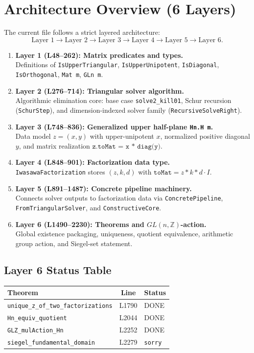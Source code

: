 \documentclass[11pt]{article}
\begin{document}
\section{Architecture Overview (6 Layers)}
The current file follows a strict layered architecture:
\[
\text{Layer 1} \rightarrow \text{Layer 2} \rightarrow \text{Layer 3} \rightarrow
\text{Layer 4} \rightarrow \text{Layer 5} \rightarrow \text{Layer 6}.
\]

\begin{enumerate}[leftmargin=1.5em]
\item \textbf{Layer 1 (L48--262): Matrix predicates and types.}\\
Definitions of \texttt{IsUpperTriangular}, \texttt{IsUpperUnipotent},
\texttt{IsDiagonal}, \texttt{IsOrthogonal}, \texttt{Mat m}, \texttt{GLn m}.
\item \textbf{Layer 2 (L276--714): Triangular solver algorithm.}\\
Algorithmic elimination core:
base case \texttt{solve2\_kill01}, Schur recursion (\texttt{SchurStep}),
and dimension-indexed solver family (\texttt{RecursiveSolveRight}).
\item \textbf{Layer 3 (L748--836): Generalized upper half-plane \texttt{Hn.H m}.}\\
Data model \(z=(x,y)\) with upper-unipotent \(x\), normalized positive diagonal \(y\),
and matrix realization \(\texttt{z.toMat = x * diag(y)}\).
\item \textbf{Layer 4 (L848--901): Factorization data type.}\\
\texttt{IwasawaFactorization} stores \((z,k,d)\) with
\(\texttt{toMat} = z * k * d \cdot I\).
\item \textbf{Layer 5 (L891--1487): Concrete pipeline machinery.}\\
Connects solver outputs to factorization data via
\texttt{ConcretePipeline}, \texttt{FromTriangularSolver}, and \texttt{ConstructiveCore}.
\item \textbf{Layer 6 (L1490--2230): Theorems and \(GL(n,\mathbb{Z})\)-action.}\\
Global existence packaging, uniqueness, quotient equivalence, arithmetic group action,
and Siegel-set statement.
\end{enumerate}

\subsection*{Layer 6 Status Table}
\begin{center}
\begin{tabular}{|l|c|l|}
\hline
\textbf{Theorem} & \textbf{Line} & \textbf{Status} \\
\hline
\texttt{unique\_z\_of\_two\_factorizations} & L1790 & DONE \\
\texttt{Hn\_equiv\_quotient} & L2044 & DONE \\
\texttt{GLZ\_mulAction\_Hn} & L2252 & DONE \\
\texttt{siegel\_fundamental\_domain} & L2279 & \texttt{sorry} \\
\hline
\end{tabular}
\end{center}
\end{document}
